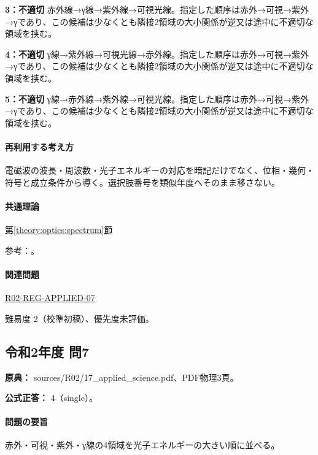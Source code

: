 \noindent\textbf{3：不適切} 赤外線→γ線→紫外線→可視光線。指定した順序は赤外→可視→紫外→γであり、この候補は少なくとも隣接2領域の大小関係が逆又は途中に不適切な領域を挟む。\par

\noindent\textbf{4：不適切} γ線→紫外線→可視光線→赤外線。指定した順序は赤外→可視→紫外→γであり、この候補は少なくとも隣接2領域の大小関係が逆又は途中に不適切な領域を挟む。\par

\noindent\textbf{5：不適切} γ線→赤外線→紫外線→可視光線。指定した順序は赤外→可視→紫外→γであり、この候補は少なくとも隣接2領域の大小関係が逆又は途中に不適切な領域を挟む。\par

\paragraph{再利用する考え方} 電磁波の波長・周波数・光子エネルギーの対応を暗記だけでなく、位相・幾何・符号と成立条件から導く。選択肢番号を類似年度へそのまま移さない。

\paragraph{共通理論} \hyperref[theory:optics:spectrum]{第\ref*{theory:optics:spectrum}節}

\par 参考：\cite{os_spectrum}。

\paragraph{関連問題} \hyperref[q:r02-reg-applied-07]{R02-REG-APPLIED-07}

\par 難易度 2（校準初稿）、優先度未評価。

\subsection{令和2年度 問7}
\label{q:r02-reg-applied-07}

\noindent\textbf{原典：} sources/R02/17\_applied\_science.pdf、PDF物理3頁。

\textbf{公式正答：} 4（single）。

\paragraph{問題の要旨} 赤外・可視・紫外・γ線の4領域を光子エネルギーの大きい順に並べる。

